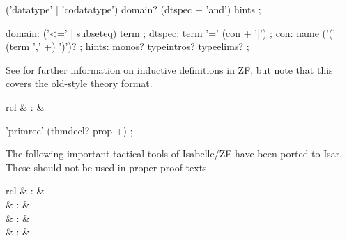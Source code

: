 \begin{isabellebody}
\begin{isamarkuptext}
  \begin{rail}
    ('datatype' | 'codatatype') domain? (dtspec + 'and') hints
    ;

    domain: ('<=' | subseteq) term
    ;
    dtspec: term '=' (con + '|')
    ;
    con: name ('(' (term ',' +) ')')?  
    ;
    hints: monos? typeintros? typeelims?
    ;
  \end{rail}

  See \cite{isabelle-ZF} for further information on inductive
  definitions in ZF, but note that this covers the old-style theory
  format.%
\end{isamarkuptext}%
\isamarkuptrue%
%
\isamarkuptrue%
%
\begin{isamarkuptext}%
\begin{matharray}{rcl}
    \hypertarget{command.ZF.primrec}{\hyperlink{command.ZF.primrec}{\mbox{}}} & : &  \\
  \end{matharray}

  \begin{rail}
    'primrec' (thmdecl? prop +)
    ;
  \end{rail}%
\end{isamarkuptext}%
\isamarkuptrue%
%
\isamarkuptrue%
%
\begin{isamarkuptext}%
The following important tactical tools of Isabelle/ZF have been
  ported to Isar.  These should not be used in proper proof texts.

  \begin{matharray}{rcl}
    \hypertarget{method.ZF.case-tac}{\hyperlink{method.ZF.case-tac}{\mbox{}}}\isa{{\isachardoublequote}\isactrlsup {\isacharasterisk}{\isachardoublequote}} & : &  \\
    \hypertarget{method.ZF.induct-tac}{\hyperlink{method.ZF.induct-tac}{\mbox{}}}\isa{{\isachardoublequote}\isactrlsup {\isacharasterisk}{\isachardoublequote}} & : &  \\
    \hypertarget{method.ZF.ind-cases}{\hyperlink{method.ZF.ind-cases}{\mbox{}}}\isa{{\isachardoublequote}\isactrlsup {\isacharasterisk}{\isachardoublequote}} & : &  \\
    \hypertarget{command.ZF.inductive-cases}{\hyperlink{command.ZF.inductive-cases}{\mbox{}}} & : &  \\
  \end{matharray}


\end{isamarkuptext}
\end{isabellebody}
